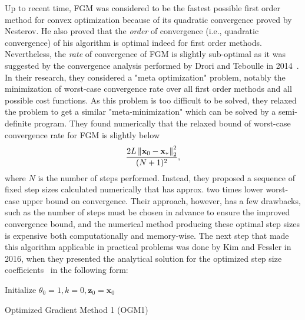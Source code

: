 Up to recent time, FGM was considered to be the fastest possible first order method for convex optimization because of its quadratic convergence proved by Nesterov. He also proved that the \textit{order} of convergence (i.e., quadratic convergence) of his algorithm is optimal indeed for first order methods. Nevertheless, the \textit{rate} of convergence of FGM is slightly sub-optimal as it was suggested by the convergence analysis performed by Drori and Teboulle in 2014~\cite{drori_performance_2014}. In their research, they considered a "meta optimization" problem, notably the minimization of worst-case convergence rate over all first order methods and all possible cost functions. As this problem is too difficult to be solved, they relaxed the problem to get a similar "meta-minimization" which can be solved by a semi-definite program. They found numerically that the relaxed bound of worst-case convergence rate for FGM is slightly below
\[\frac{2L\left\lVert\mathbf{x}_0 - \mathbf{x}_*\right\rVert_2^2}{(N+1)^2},\]
where $N$ is the number of steps performed. Instead, they proposed a sequence of fixed step sizes calculated numerically that has approx. two times lower worst-case upper bound on convergence. Their approach, however, has a few drawbacks, such as the number of steps must be chosen in advance to ensure the improved convergence bound, and the numerical method producing these optimal step sizes is expensive both computationally and memory-wise. The next step that made this algorithm applicable in practical problems was done by Kim and Fessler in 2016, when they presented the analytical solution for the optimized step size coefficients~\cite{kim_optimized_2016} in the following form:

\begin{algorithm}[H]
    \BlankLine
    Initialize $\theta_0 = 1, k = 0, \mathbf{z}_0 = \mathbf{x}_0$\\
    \caption{Optimized Gradient Method 1 (OGM1)}
\end{algorithm}

